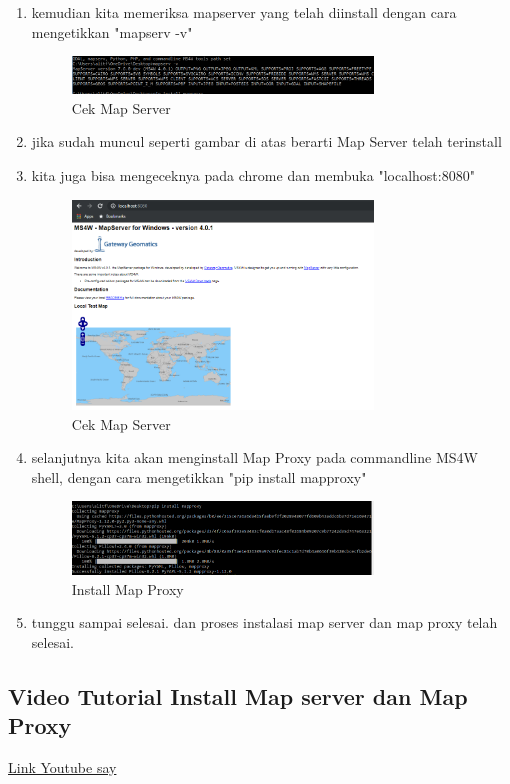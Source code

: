 \begin{enumerate}
	\item kemudian kita memeriksa mapserver yang telah diinstall dengan cara mengetikkan "mapserv -v"
    \hfill\break
	\begin{figure}[H]
		\includegraphics[width=8cm]{figures/1174057/4Tugasenam.PNG}
		\centering
		\caption{Cek Map Server}
	\end{figure}

	\item jika sudah muncul seperti gambar di atas berarti Map Server telah terinstall

	\item kita juga bisa mengeceknya pada chrome dan membuka "localhost:8080"
	\begin{figure}[H]
		\includegraphics[width=8cm]{figures/1174057/4Tugastujuh.PNG}
		\centering
		\caption{Cek Map Server}
	\end{figure}

	\item selanjutnya kita akan menginstall Map Proxy pada commandline MS4W shell, dengan cara mengetikkan "pip install mapproxy"
	\begin{figure}[H]
		\includegraphics[width=8cm]{figures/1174057/4Tugaslapan.PNG}
		\centering
		\caption{Install Map Proxy}
	\end{figure}

	\item tunggu sampai selesai. dan proses instalasi map server dan map proxy telah selesai.
\end{enumerate}

\subsection{Video Tutorial Install Map server dan Map Proxy}
\href{https://youtu.be/-cprZtvh7yU}{Link Youtube say}
